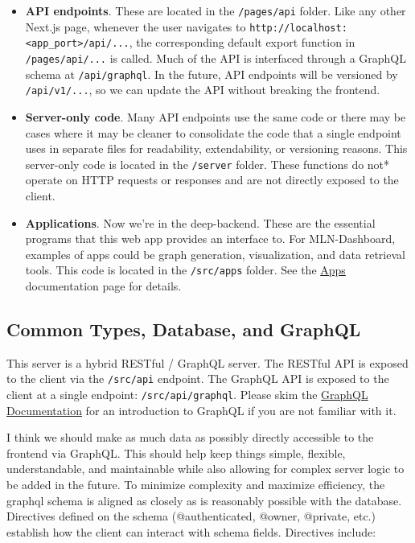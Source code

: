 \begin{itemize}
\tightlist
\item
  \textbf{API endpoints}. These are located in the \texttt{/pages/api}
  folder. Like any other Next.js page, whenever the user navigates to
  \texttt{http://localhost:\textless{}app\_port\textgreater{}/api/...},
  the corresponding default export function in \texttt{/pages/api/...}
  is called. Much of the API is interfaced through a GraphQL schema at
  \texttt{/api/graphql}. In the future, API endpoints will be versioned
  by \texttt{/api/v1/...}, so we can update the API without breaking the
  frontend.
\item
  \textbf{Server-only code}. Many API endpoints use the same code or
  there may be cases where it may be cleaner to consolidate the code
  that a single endpoint uses in separate files for readability,
  extendability, or versioning reasons. This server-only code is located
  in the \texttt{/server} folder. These functions do not* operate on
  HTTP requests or responses and are not directly exposed to the client.
\item
  \textbf{Applications}. Now we're in the deep-backend. These are the
  essential programs that this web app provides an interface to. For
  MLN-Dashboard, examples of apps could be graph generation,
  visualization, and data retrieval tools. This code is located in the
  \texttt{/src/apps} folder. See the \href{/docs/apps.md}{Apps}
  documentation page for details.
\end{itemize}

\hypertarget{common-types-database-and-graphql}{%
\subsection{Common Types, Database, and
GraphQL}\label{common-types-database-and-graphql}}

This server is a hybrid RESTful / GraphQL server. The RESTful API is
exposed to the client via the \texttt{/src/api} endpoint. The GraphQL
API is exposed to the client at a single endpoint:
\texttt{/src/api/graphql}. Please skim the
\href{/https://graphql.org/learn/}{GraphQL Documentation} for an
introduction to GraphQL if you are not familiar with it.

I think we should make as much data as possibly directly accessible to
the frontend via GraphQL. This should help keep things simple, flexible,
understandable, and maintainable while also allowing for complex server
logic to be added in the future. To minimize complexity and maximize
efficiency, the graphql schema is aligned as closely as is reasonably
possible with the database. Directives defined on the schema
(@authenticated, @owner, @private, etc.) establish how the client can
interact with schema fields. Directives include:

